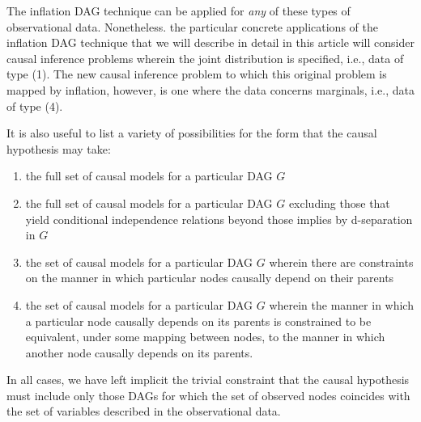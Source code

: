 The inflation DAG technique can be applied for {\em any} of these types of observational data.   Nonetheless. the particular concrete applications of the inflation DAG technique that we will describe in detail in this article will consider causal inference problems wherein the joint distribution is specified, i.e., data of type (1).  The new causal inference problem to which this original problem is mapped by inflation, however, is one where the data concerns marginals, i.e., data of type (4).


It is also useful to list a variety of possibilities for the form that the causal hypothesis may take:
\begin{enumerate}
\item the full set of causal models for a particular DAG $G$
\item the full set of causal models for a particular DAG $G$ excluding those that yield conditional independence relations beyond those implies by d-separation in $G$
\item the set of causal models for a particular DAG $G$ wherein there are constraints on the manner in which particular nodes causally depend on their parents 
\item the set of causal models for a particular DAG $G$ wherein the manner in which a particular node causally depends on its parents is constrained to be equivalent, under some mapping between nodes, to the manner in which another node causally depends on its parents. 
\end{enumerate}
In all cases, we have left implicit the trivial constraint that the causal hypothesis must include only those DAGs for which the set of observed nodes coincides with the set of variables described in the observational data. 

